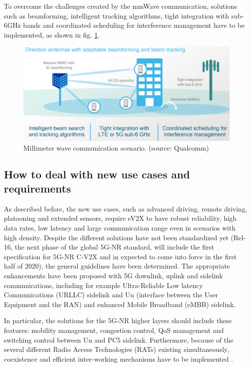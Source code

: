 \documentclass[conference,12pt,onecolumn]{IEEEtran}
\begin{document}
To overcome the challenges created by the mmWave communication, solutions such as beamforming, intelligent tracking algorithms, tight integration with sub-6GHz bands and coordinated scheduling for interference management have to be implemented, as shown in fig. \ref{fig:mmWave}.

\begin{figure}[hb]
   \centering
  \includegraphics[width=0.9\linewidth]{_Graphics/mmWave.png}
  \caption{Millimeter wave communication scenario. (source: Qualcomm)}
  \label{fig:mmWave}
\end{figure}




\subsection*{How to deal with new use cases and requirements}
As described before, the new use cases, such as advanced driving, remote driving, platooning and extended sensors, require eV2X to have robust reliability, high data rates, low latency and large communication range even in scenarios with high density. Despite the different solutions have not been standardized yet (Rel-16, the next phase of the global 5G-NR standard, will include the first specification for 5G-NR C-V2X and in expected to come into force in the first half of 2020), the general guidelines have been determined.  The appropriate enhancements have been proposed with 5G downlink, uplink and sidelink communications, including for example Ultra-Reliable Low latency Communications (URLLC) sidelink and Uu (interface between the User Equipment and the RAN) and enhanced Mobile Broadband (eMBB) sidelink.

In particular, the solutions for the 5G-NR higher layers should include these features: mobility management, congestion control, QoS management and switching control between Uu and PC5 sidelink. Furthermore, because of the several different Radio Access Technologies (RATs) existing simultaneously,  coexistence and efficient inter-working mechanisms have to be implemented \cite{chen2017vehicle}.
\end{document}
